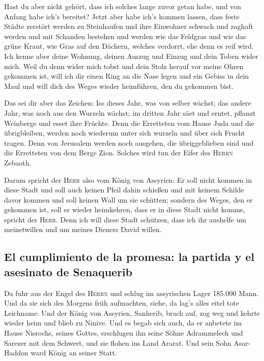  Hast du aber nicht gehört, dass ich solches lange zuvor
getan habe, und von Anfang habe ich's bereitet? Jetzt aber habe ich's
kommen lassen, dass feste Städte zerstört werden zu Steinhaufen
 und ihre Einwohner schwach und zaghaft werden und mit
Schanden bestehen und werden wie das Feldgras und wie das grüne Kraut,
wie Gras auf den Dächern, welches verdorrt, ehe denn es reif wird.
 Ich kenne aber deine Wohnung, deinen Auszug und Einzug
und dein Toben wider mich.  Weil du denn wider mich tobst
und dein Stolz herauf vor meine Ohren gekommen ist, will ich dir einen
Ring an die Nase legen und ein Gebiss in dein Maul und will dich des
Weges wieder heimführen, den du gekommen bist.

 Das sei dir aber das Zeichen: Iss dieses Jahr, was von
selber wächst; das andere Jahr, was noch aus den Wurzeln wächst; im
dritten Jahr säet und erntet, pflanzt Weinberge und esset ihre Früchte.
 Denn die Erretteten vom Hause Juda und die übrigbleiben,
werden noch wiederum unter sich wurzeln und über sich Frucht tragen.
 Denn von Jerusalem werden noch ausgehen, die
übriggeblieben sind und die Erretteten von dem Berge Zion. Solches wird
tun der Eifer des \textsc{Herrn} Zebaoth.

 Darum spricht der \textsc{Herr} also vom König von
Assyrien: Er soll nicht kommen in diese Stadt und soll auch keinen Pfeil
dahin schießen und mit keinem Schilde davor kommen und soll keinen Wall
um sie schütten;  sondern des Weges, den er gekommen ist,
soll er wieder heimkehren, dass er in diese Stadt nicht komme, spricht
der \textsc{Herr}.  Denn ich will diese Stadt schützen,
dass ich ihr aushelfe um meinetwillen und um meines Dieners David
willen.

\hypertarget{el-cumplimiento-de-la-promesa-la-partida-y-el-asesinato-de-senaquerib}{%
\subsection{El cumplimiento de la promesa: la partida y el asesinato de
Senaquerib}\label{el-cumplimiento-de-la-promesa-la-partida-y-el-asesinato-de-senaquerib}}

 Da fuhr aus der Engel des \textsc{Herrn} und schlug im
assyrischen Lager 185.000 Mann. Und da sie sich des Morgens früh
aufmachten, siehe, da lag's alles eitel tote Leichname. 
Und der König von Assyrien, Sanherib, brach auf, zog weg und kehrte
wieder heim und blieb zu Ninive.  Und es begab sich auch,
da er anbetete im Hause Nisrochs, seines Gottes, erschlugen ihn seine
Söhne Adrammelech und Sarezer mit dem Schwert, und sie flohen ins Land
Ararat. Und sein Sohn Asar-Haddon ward König an seiner Statt.

